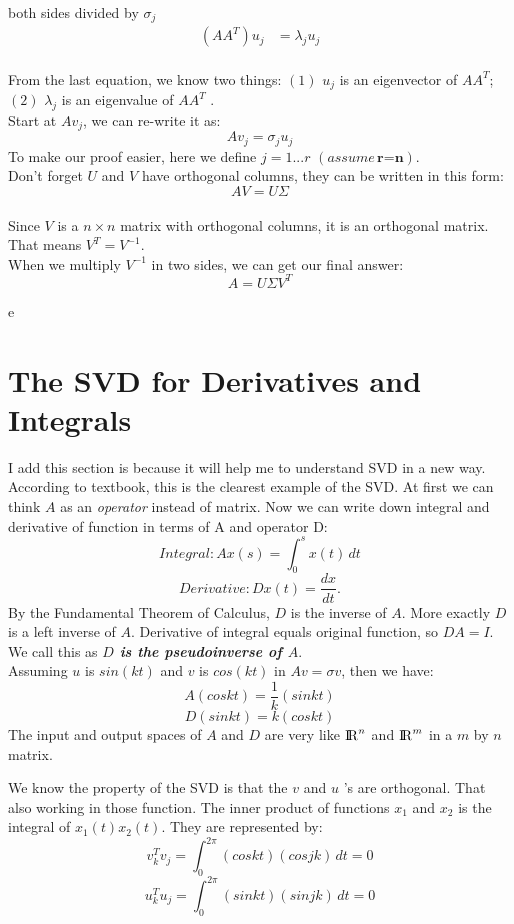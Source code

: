 \documentclass{article}
\begin{document}
\\
both sides divided by $\sigma_j$
\begin{align*}
	(AA^T)u_j  &= \lambda_j  u_j
\end{align*}
\\
From the last equation, we know two things: $(1)$ $u_j$ is an eigenvector of $AA^T$; $(2)$ $\lambda_j$ is an eigenvalue of $AA^T$ .
\\
Start at $Av_j$, we can re-write it as:
\begin{equation}
	Av_j = \sigma_j u _j
\end{equation}
To make our proof easier, here we define $j = 1 ... r$ $(assume \, \textbf{r=n})$.
\\
Don't forget $U$ and $V$ have orthogonal columns, they can be written in this form:
\begin{equation}
	AV = U \Sigma
\end{equation}
\\
Since $V$ is a $n \times n$ matrix with orthogonal columns, it is an orthogonal  matrix. That means $V^T = V^{-1}$.
\\
When we multiply $V^{-1}$ in two sides, we can get our final answer:
\begin{equation}
	A = U \Sigma V^T 
\end{equation} 

\newpage
e
\section{The SVD for Derivatives and Integrals}
I add this section is because it will help me to understand SVD in a new way. According to textbook,  this is the clearest example of the SVD. At first we can think $A$ as an \textit{operator} instead of matrix. Now we can write down integral and derivative of function in terms of A and operator D:
\[ Integral: Ax(s) = \int_{0}^{s} x(t) \,dt\] 
\[Derivative: Dx(t) = \frac{dx}{dt}.\]
By the Fundamental Theorem of Calculus, $D$ is the inverse of $A$. More exactly $D$ is a left inverse of $A$. Derivative of integral equals original function, so $DA = I$. We call this as \textbf{\textit{$D$ is the pseudoinverse of $A$}}.
\\
Assuming $u$ is $sin(kt)$ and $v$ is $cos(kt)$ in $Av = \sigma v$, then we have:
\[A(coskt) = \frac{1}{k}(sinkt)\]
\[D(sinkt) = k(coskt)\]
The input and output spaces of $A$ and $D$ are very like ${\rm I\!R}^{n}$ and ${\rm I\!R}^{m}$ in a $m$ by $n$ matrix.

We know the property of the SVD is that the $v$ and $u$ 's are orthogonal. That also working in those function. The inner product of functions $x_1$ and $x_2$ is the integral of $x_1(t)x_2(t)$. They are represented by:
\[v_k^{T}v_j =  \int_{0}^{2 \pi} (coskt)(cosjk) \,dt = 0\]
\[u_k^{T}u_j =  \int_{0}^{2 \pi} (sinkt)(sinjk) \,dt = 0\]
\end{document}
